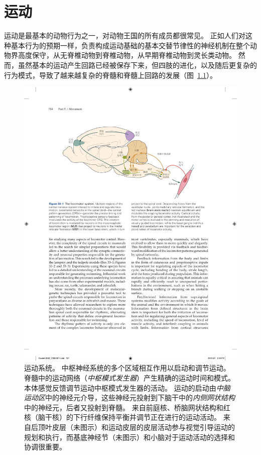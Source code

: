 \chapter{运动} \label{chap:chap33}

运动是最基本的动物行为之一，对动物王国的所有成员都很常见。
正如人们对这种基本行为的预期一样，负责构成运动基础的基本交替节律性的神经机制在整个动物界高度保守，从无脊椎动物到脊椎动物，从早期脊椎动物到灵长类动物。 
然而，虽然基本的运动产生回路已经被保存下来，但四肢的进化，以及随后更复杂的行为模式，导致了越来越复杂的脊髓和脊髓上回路的发展（图~\ref{fig:33_1}）。


\begin{figure}[htbp]
	\centering
	\includegraphics[width=0.95\linewidth]{chap33/fig_33_1}
	\caption{运动系统。
	中枢神经系统的多个区域相互作用以启动和调节运动。
	脊髓中的运动网络（\textit{中枢模式发生器}）产生精确的运动时间和模式。
	本体感觉反馈调节运动中枢模式发生器的活动。
	运动的启动由\textit{中脑运动区}中的神经元介导，这些神经元投射到下脑干中的\textit{内侧网状结构}中的神经元，后者又投射到脊髓。
	来自前庭核、桥脑网状结构和红核（脑干核）的下行纤维保持平衡并调节正在进行的运动活动。
	来自后顶叶皮层（未图示）和运动皮层的皮层活动参与视觉引导运动的规划和执行，而基底神经节（未图示）和小脑对于运动活动的选择和协调很重要。}
	\label{fig:33_1}
\end{figure}


